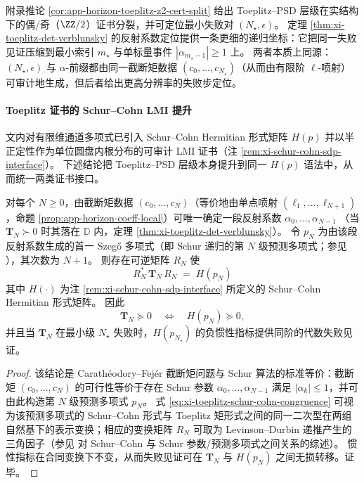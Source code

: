 \begin{remark}\label{rem:xi-verblunsky-z2-compatible}
附录推论 \ref{cor:app-horizon-toeplitz-z2-cert-split} 给出 Toeplitz--PSD 层级在实结构下的偶/奇（\(\ZZ/2\)）证书分裂，并可定位最小失败对 \((N_\star,\epsilon)\)。
定理 \ref{thm:xi-toeplitz-det-verblunsky} 的反射系数定位提供一条更细的递归坐标：它把同一失败见证压缩到最小索引 \(m_\star\) 与单标量事件 \(|\alpha_{m_\star-1}|\ge 1\) 上。
两者本质上同源：\((N_\star,\epsilon)\) 与 \(\alpha\)-前缀都由同一截断矩数据 \((c_0,\dots,c_{N_\star})\)（从而由有限阶 \(\ell\)-喷射）可审计地生成，但后者给出更高分辨率的失败步定位。
\end{remark}

\paragraph{Toeplitz 证书的 Schur--Cohn LMI 提升}
文内对有限维通道多项式已引入 Schur--Cohn Hermitian 形式矩阵 \(H(p)\) 并以半正定性作为单位圆盘内根分布的可审计 LMI 证书（注 \ref{rem:xi-schur-cohn-sdp-interface}）。
下述结论把 Toeplitz--PSD 层级本身提升到同一 \(H(p)\) 语法中，从而统一两类证书接口。

\begin{theorem}\label{thm:xi-toeplitz-schur-cohn-lift}
对每个 \(N\ge 0\)，由截断矩数据 \((c_0,\dots,c_N)\)（等价地由单点喷射 \((\ell_1,\dots,\ell_{N+1})\)，命题 \ref{prop:app-horizon-coeff-local}）可唯一确定一段反射系数
\(
\alpha_0,\dots,\alpha_{N-1}
\)
（当 \(\mathbf{T}_N\succ 0\) 时其落在 \(\mathbb{D}\) 内，定理 \ref{thm:xi-toeplitz-det-verblunsky}）。
令 \(p_N\) 为由该段反射系数生成的首一 Szeg\H{o} 多项式（即 Schur 递归的第 \(N\) 级预测多项式；参见 \cite{Simon2005OPUC1}），其次数为 \(N{+}1\)。
则存在可逆矩阵 \(R_N\) 使
\begin{equation}\label{eq:xi-toeplitz-schur-cohn-congruence}
\boxed{\;
R_N^\ast\,\mathbf{T}_N\,R_N
\;=\;
H(p_N)\;}
\end{equation}
其中 \(H(\cdot)\) 为注 \ref{rem:xi-schur-cohn-sdp-interface} 所定义的 Schur--Cohn Hermitian 形式矩阵。
因此
\[
\mathbf{T}_N\succeq 0
\quad\Longleftrightarrow\quad
H(p_N)\succeq 0,
\]
并且当 \(\mathbf{T}_N\) 在最小级 \(N_\star\) 失败时，\(H(p_{N_\star})\) 的负惯性指标提供同阶的代数失败见证。
\end{theorem}

\begin{proof}
该结论是 Carath\'eodory--Fej\'er 截断矩问题与 Schur 算法的标准等价：截断矩 \((c_0,\dots,c_N)\) 的可行性等价于存在 Schur 参数 \(\alpha_0,\dots,\alpha_{N-1}\) 满足 \(|\alpha_k|\le 1\)，并可由此构造第 \(N\) 级预测多项式 \(p_N\)。
式 \eqref{eq:xi-toeplitz-schur-cohn-congruence} 可视为该预测多项式的 Schur--Cohn 形式与 Toeplitz 矩形式之间的同一二次型在两组自然基下的表示变换；相应的变换矩阵 \(R_N\) 可取为 Levinson--Durbin 递推产生的三角因子（参见 \cite{DymYoung1990SchurCohnMatrixPolynomials,Simon2005OPUC1} 对 Schur--Cohn 与 Schur 参数/预测多项式之间关系的综述）。
惯性指标在合同变换下不变，从而失败见证可在 \(\mathbf{T}_N\) 与 \(H(p_N)\) 之间无损转移。证毕。
\end{proof}

